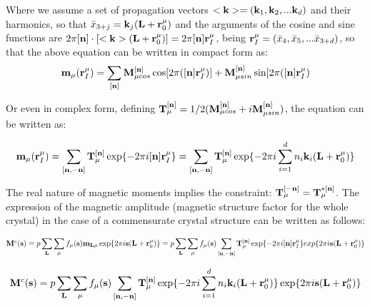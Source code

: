 \documentclass[10pt]{article}
\begin{document}
Where we assume a set of propagation vectors $ {< \bf k}>=({\bf k}_1,{\bf k}_2, ... {\bf k}_d) $ and their harmonics, so that ${\bar x}_{3+j}= {\bf k}_j ({\bf L}+{\bf r}_0^\mu) $ and the arguments of the cosine and sine functions are $ 2\pi [{\bf n}] \cdot[<{\bf k}> ({\bf L}+{\bf r}_0^\mu)] = 2\pi [{\bf n}]{\bf r}_I^\mu$, being $ {\bf r}_I^\mu=(\bar{x}_4, \bar{x}_5, ... \bar{x}_{3+d})$, so that the above equation can be written in compact form as:
\begin{equation} \label{mmod_funct2}
{\bf m}_\mu({\bf r}_I^{\mu}) =\sum\limits_{[{\bf n}]}  {\bf M}_{\mu cos}^{[{\bf n}]} \cos[2\pi([{\bf n}] {\bf r}_I^{\mu})] + {\bf M}_{\mu sin}^{[{\bf n}]} \sin[2\pi([{\bf n}] {\bf r}_I^{\mu})
\end{equation}

Or even in complex form, defining $ {\bf T}_{\mu}^{[{\bf n}]}=1/2({{\bf M}_{\mu cos}^{[{\bf n}]}+i{\bf M}_{\mu sin}^{[{\bf n}]}})$, the equation can be written as:

\begin{equation} \label{mmod_functa}
{\bf m}_\mu({\bf r}_I^{\mu}) =\sum_{[{\bf n},-{\bf n}]}  {\bf T}_{\mu}^{[{\bf n}]} \exp\{-2\pi i[{\bf n}] {\bf r}_I^{\mu}\}=\sum_{[{\bf n},-{\bf n}]}  {\bf T}_{\mu}^{[{\bf n}]} \exp\{ -2\pi i \sum_{i=1}^d n_i{\bf k}_i ({\bf L}+{\bf r}_0^\mu) \}
\end{equation}


The real nature of magnetic moments implies the constraint:
$ {\bf T}_{\mu}^{[-{\bf n}]}={\bf T}_{\mu}^{*[{\bf n}]}$.
The expression of the magnetic amplitude (magnetic structure factor for the whole crystal) in the case of a commensurate crystal structure can be written as follows:


\begin{equation} \label{amplitude_mag1}
{\bf M}^c({\bf s})=p\sum_{\bf L} \sum_{{\mu}} f_{\mu}({\bf s}) {\bf m}_{{\bf L}\mu} \exp\{2\pi i {\bf s}({\bf L}+{\bf r}_0^\mu)\}=p\sum_{\bf L} \sum_{{\mu}} f_{\mu}({\bf s}) \sum\limits_{[{\bf n},-{\bf n}]}  {\bf T}_{\mu}^{[{\bf n}]} \exp\{-2\pi i[{\bf n}] {\bf r}_I^{\mu}\} exp\{2\pi i {\bf s}({\bf L}+{\bf r}_0^\mu)\}
\end{equation}

\begin{equation} \label{amplitude_mag2}
{\bf M}^c({\bf s})=p\sum_{\bf L} \sum_{{\mu}} f_{\mu}({\bf s}) \sum_{[{\bf n},-{\bf n}]}  {\bf T}_{\mu}^{[{\bf n}]} \exp\{ -2\pi i \sum_{i=1}^d n_i{\bf k}_i ({\bf L}+{\bf r}_0^\mu) \} \exp\{2\pi i {\bf s}({\bf L}+{\bf r}_0^\mu)\}
\end{equation}
\end{document}
